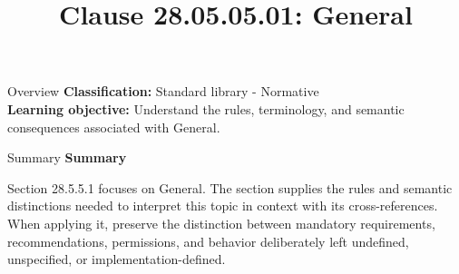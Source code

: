 \documentclass[10pt,letterpaper]{article}
\title{Clause 28.05.05.01: General}
\author{}
\date{}
\begin{document}
\maketitle
\begin{CornellOverviewBox}{Overview}
\textbf{Classification:} Standard library - Normative\\[2pt]
\textbf{Learning objective:} Understand the rules, terminology, and semantic consequences associated with General.
\end{CornellOverviewBox}\begin{CornellSummaryBox}{Summary}
{\sffamily\bfseries\color{Accent} Summary}\par\vspace{3pt}Section 28.5.5.1 focuses on General. The section supplies the rules and semantic distinctions needed to interpret this topic in context with its cross-references. When applying it, preserve the distinction between mandatory requirements, recommendations, permissions, and behavior deliberately left undefined, unspecified, or implementation-defined.
\end{CornellSummaryBox}
\end{document}
